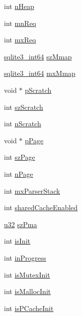 \begin{DoxyCompactItemize}
int \hyperlink{struct_sqlite3_config_a0ea077b3d2d24303af5a30df4d9d5edf}{n\+Heap}
\item 
int \hyperlink{struct_sqlite3_config_a2dfb8267a9ac25087c2b53d6f3ed937d}{mn\+Req}
\item 
int \hyperlink{struct_sqlite3_config_ade278f37a74995898e7aeac99d97c9aa}{mx\+Req}
\item 
\hyperlink{sqlite3_8c_a0a4d3e6c1ad46f90e746b920ab6ca0d2}{sqlite3\+\_\+int64} \hyperlink{struct_sqlite3_config_a16be0b65471da845d6b829adf5f17957}{sz\+Mmap}
\item 
\hyperlink{sqlite3_8c_a0a4d3e6c1ad46f90e746b920ab6ca0d2}{sqlite3\+\_\+int64} \hyperlink{struct_sqlite3_config_ad96e6aa2ef236c16df4ff57b6c11b2f1}{mx\+Mmap}
\item 
void $\ast$ \hyperlink{struct_sqlite3_config_a5816c3e492705243db472d471eedf71c}{p\+Scratch}
\item 
int \hyperlink{struct_sqlite3_config_a27161f3af9d9fa4dc7c97ce5fbc5704e}{sz\+Scratch}
\item 
int \hyperlink{struct_sqlite3_config_a7810b251a0971066e959228e5ec17ba5}{n\+Scratch}
\item 
void $\ast$ \hyperlink{struct_sqlite3_config_a192685931829ee40cbef934bf644c7ce}{p\+Page}
\item 
int \hyperlink{struct_sqlite3_config_a0ead96b04a1cc6dc6ec781782e82d052}{sz\+Page}
\item 
int \hyperlink{struct_sqlite3_config_a006467184a1acc90b6f1b18626889e08}{n\+Page}
\item 
int \hyperlink{struct_sqlite3_config_aec08e91dd93acd0b206d1a672ea703f5}{mx\+Parser\+Stack}
\item 
int \hyperlink{struct_sqlite3_config_a5c1b69700e52ef116cbc6fdde53ef47d}{shared\+Cache\+Enabled}
\item 
\hyperlink{sqlite3_8c_a03ad5adfaeb9b7640dde78a0cc390319}{u32} \hyperlink{struct_sqlite3_config_a0f0553f38ecaca298abe54686a1c4bcb}{sz\+Pma}
\item 
int \hyperlink{struct_sqlite3_config_a6fbd614062a06fdd84bb4ba9d44c2028}{is\+Init}
\item 
int \hyperlink{struct_sqlite3_config_adbf46645b827d0c7b368e6b1298a196e}{in\+Progress}
\item 
int \hyperlink{struct_sqlite3_config_a5e1feee8fb346216d60009b8f8706ae9}{is\+Mutex\+Init}
\item 
int \hyperlink{struct_sqlite3_config_ab3402c7fd0c57cc1383280eb49ebb159}{is\+Malloc\+Init}
\item 
int \hyperlink{struct_sqlite3_config_ae992d949693471b5a7afeac185afd014}{is\+P\+Cache\+Init}

\end{DoxyCompactItemize}
